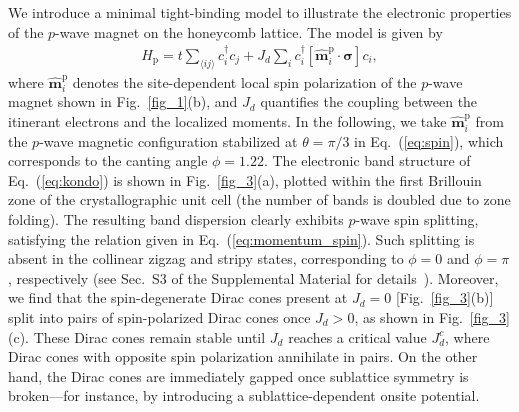 \documentclass[aps,prl,twocolumn,showpacs,superscriptaddress]{revtex4-2}
\newcommand{\bea}{\begin{eqnarray}}
\newcommand{\eea}{\end{eqnarray}}
\newcommand{\bs}{\boldsymbol}
\begin{document}
We introduce a minimal tight-binding model to illustrate the electronic properties of the $p$-wave magnet on the honeycomb lattice. The model is given by
\bea
H_{\text{p}} = t \sum_{\langle i j \rangle} c_{i}^\dagger c_{j}
+ J_d \sum_i c_{i}^\dagger [\hat{\bs{m}}_i^{\mathrm{p}} \!\cdot\! \bs{\sigma}] c_{i},
\label{eq:kondo}
\eea
where $\hat{\bs{m}}_i^{\mathrm{p}}$ denotes the site-dependent local spin polarization of the $p$-wave magnet shown in Fig.~\ref{fig_1}(b), and $J_d$ quantifies the coupling between the itinerant electrons and the localized moments. In the following, we take $\hat{\bs{m}}_i^{\mathrm{p}}$ from the $p$-wave magnetic configuration stabilized at $\theta=\pi/3$ in Eq.~(\ref{eq:spin}), which corresponds to the canting angle $\phi=1.22$. The electronic band structure of Eq.~(\ref{eq:kondo}) is shown in Fig.~\ref{fig_3}(a), plotted within the first Brillouin zone of the crystallographic unit cell (the number of bands is doubled due to zone folding). The resulting band dispersion clearly exhibits $p$-wave spin splitting, satisfying the relation given in Eq.~(\ref{eq:momentum_spin}). Such splitting is absent in the collinear zigzag and stripy states, corresponding to $\phi=0$ and $\phi=\pi$, respectively (see Sec.~S3 of the Supplemental Material for details~\cite{supplemental}). Moreover, we find that the spin-degenerate Dirac cones present at $J_d = 0$ [Fig.~\ref{fig_3}(b)] split into pairs of spin-polarized Dirac cones once $J_d > 0$, as shown in Fig.~\ref{fig_3}(c). These Dirac cones remain stable until $J_d$ reaches a critical value $J_d^c$, where Dirac cones with opposite spin polarization annihilate in pairs. On the other hand, the Dirac cones are immediately gapped once sublattice symmetry is broken—for instance, by introducing a sublattice-dependent onsite potential.
\end{document}
